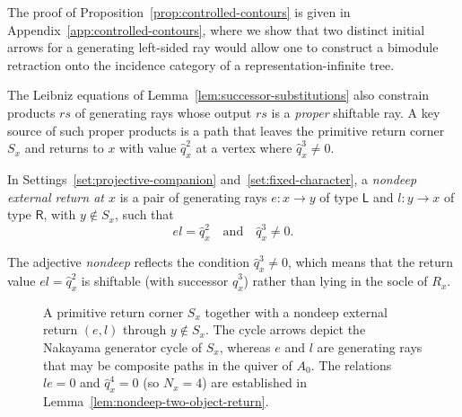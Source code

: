 The proof of Proposition~\ref{prop:controlled-contours} is given in Appendix~\ref{app:controlled-contours}, where we show that two distinct initial arrows for a generating left-sided ray would allow one to construct a bimodule retraction onto the incidence category of a representation-infinite tree.

The Leibniz equations of Lemma~\ref{lem:successor-substitutions} also constrain products $rs$ of generating rays whose output $rs$ is a \emph{proper} shiftable ray. A key source of such proper products is a path that leaves the primitive return corner $S_x$ and returns to $x$ with value $\widehat q_x^2$ at a vertex where $\widehat q_x^3\ne0$.

\begin{definition}
\label{def:nondeep-return}
In Settings~\ref{set:projective-companion} and~\ref{set:fixed-character}, a \emph{nondeep external return at $x$} is a pair of generating rays $e\colon x\to y$ of type $\mathsf L$ and $l\colon y\to x$ of type $\mathsf R$, with $y\notin S_x$, such that
\[
  el=\widehat q_x^2\quad\text{and}\quad\widehat q_x^3\ne0.
\]
\end{definition}

The adjective \emph{nondeep} reflects the condition $\widehat q_x^3\ne0$, which means that the return value $el=\widehat q_x^2$ is shiftable (with successor $\widehat q_x^3$) rather than lying in the socle of $R_x$.

\begin{figure}[htbp]
\centering
{}
\caption{A primitive return corner $S_x$ together with a nondeep external return $(e,l)$ through $y\notin S_x$. The cycle arrows depict the Nakayama generator cycle of $S_x$, whereas $e$ and $l$ are generating rays that may be composite paths in the quiver of $A_0$. The relations $le=0$ and $\widehat q_x^4=0$ (so $N_x=4$) are established in Lemma~\ref{lem:nondeep-two-object-return}.}
\label{fig:primitive-corner-return}
\end{figure}

